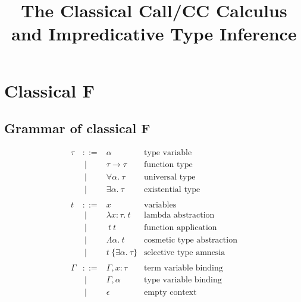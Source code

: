 \documentclass{amsart}
\title{
The Classical Call/CC Calculus
\penalty-20000
and Impredicative Type Inference
}
\begin{document}
\newcommand{\nc}{\newcommand}
\newcommand{\DotExpr}[2]{#1 #2.\ }
\nc\Abs   {\DotExpr\lambda}
\nc\All   {\DotExpr\forall}
\nc\CallCC{\operatorname{call/cc}}
\nc\Cps   {\operatorname{cps}}
\nc\Dn [1]{(#1 \R \bot) \R \bot}
\nc\Ex    {\DotExpr\exists}
\nc\FV    {\operatorname{FV}}
\nc\Mgs   {\operatorname{mgs}}
\nc\Or    {\ | \ }
\nc\Prune {\operatorname{prune}}
\nc\Recall{\DotExpr\Xi} %
\nc\Tabs  {\DotExpr\Lambda}
\nc\R     {\rightarrow}
\nc\Unify {\operatorname{unify}}

\maketitle
\tableofcontents

\section{Classical F}

\subsection{Grammar of classical F}

\nc\Ftype{
\tau & ::= & \alpha & \mbox{type variable} \\
&\Or& \tau \rightarrow \tau & \mbox{function type} \\
&\Or& \All\alpha\tau & \mbox{universal type} \\
}

\nc\CFtype{
\Ftype
&\Or& \Ex\alpha\tau & \mbox{existential type} \\
}

\nc\CFterm{
t & ::= & x & \mbox{variables} \\
&\Or& \Abs{x:\tau}t  & \mbox{lambda abstraction} \\
&\Or& \ t~t & \mbox{function application} \\
}

\nc\SelectiveTypeAmnesia{
&\Or& t~\{\Ex\alpha\tau\} & \mbox{selective type amnesia} \\
}

\nc\TypingContexts{
\Gamma & ::= & \Gamma, x : \tau & \mbox{term variable binding}\\
&\Or& \Gamma, \alpha& \mbox{type variable binding} \\
&\Or& \epsilon & \mbox{empty context}\\ \\
}

\[
\begin{array}{lclr}
\CFtype
\\
\CFterm
&\Or& \Tabs\alpha t & \mbox{cosmetic type abstraction} \\
\SelectiveTypeAmnesia
\\
\TypingContexts
\end{array}
\]
\end{document}
